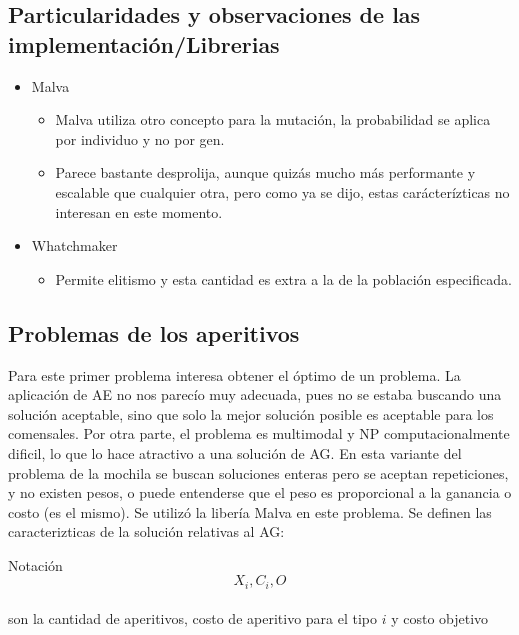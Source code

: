 \documentclass[9pt,conference]{IEEEtran}
\begin{document}
	\subsection{Particularidades y observaciones de las implementaci\'on/Librerias}
	\begin{itemize}
		\item Malva
		\begin{itemize}
			\item Malva utiliza otro concepto para la mutaci\'on, la probabilidad se aplica por individuo y no por gen.
			\item Parece bastante desprolija, aunque quiz\'as mucho m\'as performante y escalable que cualquier otra, pero como ya se dijo, estas car\'acter\'izticas no interesan en este momento.
		\end{itemize}

		\item Whatchmaker
		\begin{itemize}	
			\item Permite elitismo y esta cantidad es extra a la de la poblaci\'on especificada.
		\end{itemize}
	\end{itemize}


	\subsection{Problemas de los aperitivos}
	
	Para este primer problema interesa obtener el \'optimo de un problema. La aplicaci\'on de AE no nos parec\'io muy adecuada, pues no se estaba buscando una solución aceptable, sino que solo la mejor solución posible es aceptable para los comensales. Por otra parte, el problema es multimodal y NP computacionalmente dificil, lo que lo hace atractivo a una solución de AG.
	En esta variante del problema de la mochila se buscan soluciones enteras pero se aceptan repeticiones, y no existen pesos, o puede entenderse que el peso es proporcional a la ganancia o costo (es el mismo).
	Se utilizó la libería Malva en este problema.
	Se definen las caracterizticas de la solución relativas al AG:

	Notación
		$$X_i,C_i,O$$\\ son la cantidad de aperitivos, costo de aperitivo para el tipo $i$ y costo objetivo\\
\end{document}
